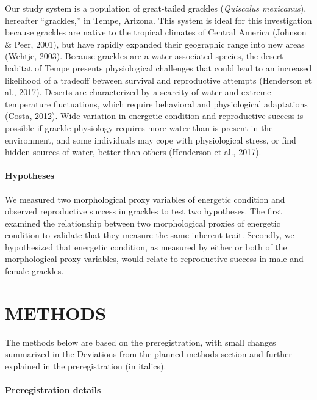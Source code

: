 \documentclass[
]{article}
\begin{document}
Our study system is a population of great-tailed grackles
(\emph{Quiscalus mexicanus}), hereafter ``grackles,'' in Tempe, Arizona.
This system is ideal for this investigation because grackles are native
to the tropical climates of Central America (Johnson \& Peer, 2001), but
have rapidly expanded their geographic range into new areas (Wehtje,
2003). Because grackles are a water-associated species, the desert
habitat of Tempe presents physiological challenges that could lead to an
increased likelihood of a tradeoff between survival and reproductive
attempts (Henderson et al., 2017). Deserts are characterized by a
scarcity of water and extreme temperature fluctuations, which require
behavioral and physiological adaptations (Costa, 2012). Wide variation
in energetic condition and reproductive success is possible if grackle
physiology requires more water than is present in the environment, and
some individuals may cope with physiological stress, or find hidden
sources of water, better than others (Henderson et al., 2017).

\hypertarget{hypotheses}{%
\paragraph{\texorpdfstring{\textbf{Hypotheses}}{Hypotheses}}\label{hypotheses}}

We measured two morphological proxy variables of energetic condition and
observed reproductive success in grackles to test two hypotheses. The
first examined the relationship between two morphological proxies of
energetic condition to validate that they measure the same inherent
trait. Secondly, we hypothesized that energetic condition, as measured
by either or both of the morphological proxy variables, would relate to
reproductive success in male and female grackles.

\hypertarget{methods}{%
\section{METHODS}\label{methods}}

The methods below are based on the preregistration, with small changes
summarized in the Deviations from the planned methods section and
further explained in the preregistration (in italics).

\hypertarget{preregistration-details}{%
\paragraph{\texorpdfstring{\textbf{Preregistration
details}}{Preregistration details}}\label{preregistration-details}}
\end{document}
